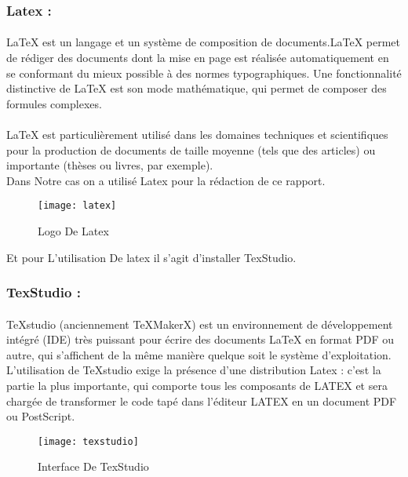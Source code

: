 \documentclass[12pt, openany]{report}
\begin{document}
\subsubsection{ \large Latex :}
\paragraph{} LaTeX est un langage et un système de composition de documents.LaTeX permet de rédiger des documents dont la mise en page est réalisée automatiquement en se conformant du mieux possible à des normes typographiques. Une fonctionnalité distinctive de LaTeX est son mode mathématique, qui permet de composer des formules complexes.
\paragraph{}LaTeX est particulièrement utilisé dans les domaines techniques et scientifiques pour la production de documents de taille moyenne (tels que des articles) ou importante (thèses ou livres, par exemple).\\ Dans Notre cas on a utilisé Latex pour la rédaction de ce rapport.

\begin{figure}[!h]
	\centering
	\texttt{[image: latex]}
	\caption{Logo De Latex}
	\label{fig:latex}
\end{figure}

Et pour L'utilisation De latex il s'agit d'installer TexStudio.
\subsubsection{\large TexStudio :}
\paragraph{}TeXstudio (anciennement TeXMakerX) est un environnement de développement intégré (IDE) très puissant pour écrire des documents LaTeX en format PDF ou autre, qui s’affichent de la même manière quelque soit le système d’exploitation. L’utilisation de TeXstudio exige la présence d'une distribution Latex : c’est la partie la plus importante, qui comporte tous les composants de LATEX et sera chargée de transformer le code tapé dans l’éditeur LATEX en un document PDF ou PostScript.
\begin{figure}[!h]
	\centering
	\texttt{[image: texstudio]}
	\caption{Interface De TexStudio}
	\label{fig:tex}
\end{figure}
\newpage
\end{document}
